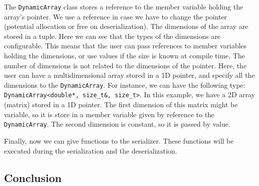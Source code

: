The \texttt{DynamicArray} class stores a reference to the member variable
holding the array's pointer. We use a reference in case we have to change the
pointer (potential allocation or free on deserialization). The dimensions of the
array are stored in a tuple. Here we can see that the types of the dimensions
are configurable. This means that the user can pass references to member
variables holding the dimensions, or use values if the size is known at compile
time. The number of dimensions is not related to the dimensions of the pointer.
Here, the user can have a multidimensional array stored in a 1D pointer, and
specify all the dimensions to the \texttt{DynamicArray}. For instance, we can
have the following type: \texttt{DynamicArray<double*, size\_t&, size\_t>}. In
this example, we have a 2D array (matrix) stored in a 1D pointer. The first
dimension of this matrix might be variable, so it is store in a member variable
given by reference to the \texttt{DynamicArray}. The second dimension is
constant, so it is passed by value.


Finally, now we can give functions to the serializer. These functions will be
executed during the serialization and the deserialization.


\subsection{Conclusion}
